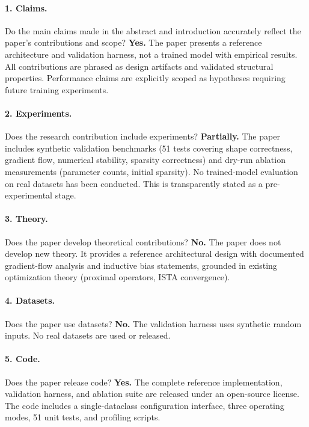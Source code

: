 \documentclass{article}
\begin{document}
\paragraph{1. Claims.}
Do the main claims made in the abstract and introduction accurately reflect
the paper's contributions and scope?
\textbf{Yes.} The paper presents a reference architecture and validation
harness, not a trained model with empirical results. All contributions are
phrased as design artifacts and validated structural properties. Performance
claims are explicitly scoped as hypotheses requiring future training
experiments.

\paragraph{2. Experiments.}
Does the research contribution include experiments?
\textbf{Partially.} The paper includes synthetic validation benchmarks
(51 tests covering shape correctness, gradient flow, numerical stability,
sparsity correctness) and dry-run ablation measurements (parameter counts,
initial sparsity). No trained-model evaluation on real datasets has been
conducted. This is transparently stated as a pre-experimental stage.

\paragraph{3. Theory.}
Does the paper develop theoretical contributions?
\textbf{No.} The paper does not develop new theory. It provides a reference
architectural design with documented gradient-flow analysis and inductive bias
statements, grounded in existing optimization theory (proximal operators, ISTA
convergence).

\paragraph{4. Datasets.}
Does the paper use datasets?
\textbf{No.} The validation harness uses synthetic random inputs. No real
datasets are used or released.

\paragraph{5. Code.}
Does the paper release code?
\textbf{Yes.} The complete reference implementation, validation harness, and
ablation suite are released under an open-source license. The code includes a
single-dataclass configuration interface, three operating modes, 51 unit
tests, and profiling scripts.
\end{document}
